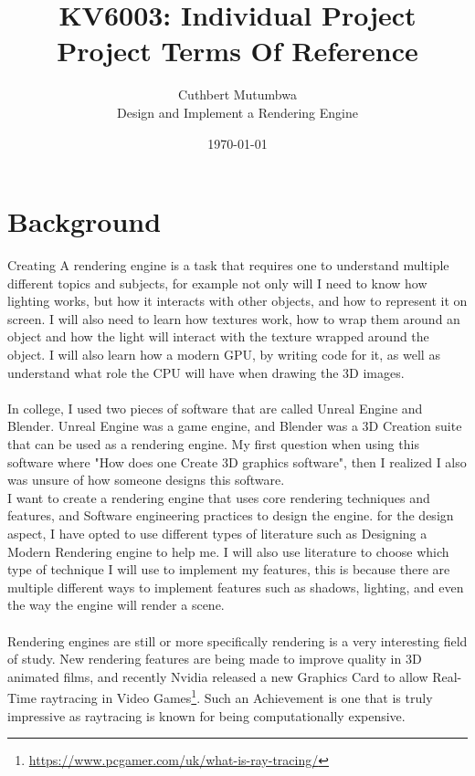 \documentclass[]{article}
\begin{document}
\title{KV6003: Individual Project\\ Project Terms Of Reference}
\author{Cuthbert Mutumbwa\\ Design and Implement a Rendering Engine}
\date{\today}

\maketitle

\section{Background}
Creating A rendering engine is a task that requires one to understand multiple different topics and subjects, for example not only will I need to know how lighting works, but how it interacts with other objects, and how to represent it on screen. I will also need to learn how textures work, how to wrap them around an object and how the light will interact with the texture wrapped around the object.
I will also learn how a modern GPU, by writing code for it, as well as understand what role the CPU will have when drawing the 3D images.
\\\\
In college, I used two pieces of software that are called Unreal Engine and Blender. Unreal Engine was a game engine, and Blender was a 3D Creation suite that can be used as a rendering engine.
My first question when using this software where "How does one Create 3D graphics software", then I realized I also was unsure of how someone designs this software.
\\
I want to create a rendering engine that uses core rendering techniques and features, and Software engineering practices to design the engine. for the design aspect, I have opted to use different types of literature such as Designing a Modern Rendering engine \cite{designengine} to help me.  I will also use literature to choose which type of technique I will use to implement my features, this is because there are multiple different ways to implement features such as shadows, lighting, and even the way the engine will render a scene.
\\\\
Rendering engines are still or more specifically rendering is a very interesting field of study. New rendering features are being made to improve quality in 3D animated films, and recently Nvidia released a new Graphics Card to allow Real-Time raytracing in Video Games\footnote{\url{https://www.pcgamer.com/uk/what-is-ray-tracing/}}. Such an Achievement is one that is truly impressive as raytracing is known for being computationally expensive. 
\end{document}

